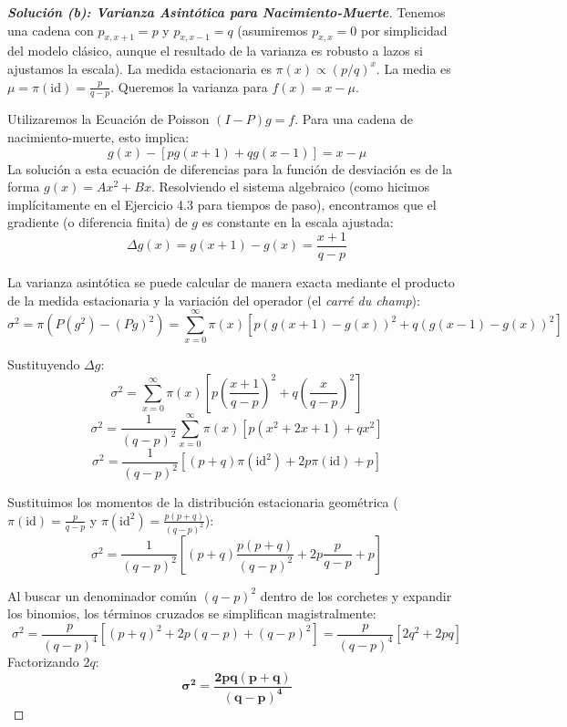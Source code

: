 \documentclass[10pt,a4paper]{article}
\begin{document}
\begin{proof}[\textbf{Solución (b): Varianza Asintótica para Nacimiento-Muerte}]
    Tenemos una cadena con $p_{x, x+1} = p$ y $p_{x, x-1} = q$ (asumiremos $p_{x,x}=0$ por simplicidad del modelo clásico, aunque el resultado de la varianza es robusto a lazos si ajustamos la escala). La medida estacionaria es $\pi(x) \propto (p/q)^x$. La media es $\mu = \pi(\text{id}) = \frac{p}{q-p}$. Queremos la varianza para $f(x) = x - \mu$.
    
    Utilizaremos la Ecuación de Poisson $(I - P)g = f$. Para una cadena de nacimiento-muerte, esto implica:
    \[ g(x) - [p g(x+1) + q g(x-1)] = x - \mu \]
    La solución a esta ecuación de diferencias para la función de desviación es de la forma $g(x) = A x^2 + B x$. Resolviendo el sistema algebraico (como hicimos implícitamente en el Ejercicio 4.3 para tiempos de paso), encontramos que el gradiente (o diferencia finita) de $g$ es constante en la escala ajustada:
    \[ \Delta g(x) = g(x+1) - g(x) = \frac{x+1}{q-p} \]
    
    La varianza asintótica se puede calcular de manera exacta mediante el producto de la medida estacionaria y la variación del operador (el \textit{carré du champ}):
    \[ \sigma^2 = \pi \left( P(g^2) - (Pg)^2 \right) = \sum_{x=0}^\infty \pi(x) \left[ p(g(x+1)-g(x))^2 + q(g(x-1)-g(x))^2 \right] \]
    
    Sustituyendo $\Delta g$:
    \[ \sigma^2 = \sum_{x=0}^\infty \pi(x) \left[ p\left(\frac{x+1}{q-p}\right)^2 + q\left(\frac{x}{q-p}\right)^2 \right] \]
    \[ \sigma^2 = \frac{1}{(q-p)^2} \sum_{x=0}^\infty \pi(x) \left[ p(x^2+2x+1) + qx^2 \right] \]
    \[ \sigma^2 = \frac{1}{(q-p)^2} \left[ (p+q)\pi(\text{id}^2) + 2p\pi(\text{id}) + p \right] \]
    
    Sustituimos los momentos de la distribución estacionaria geométrica ($\pi(\text{id}) = \frac{p}{q-p}$ y $\pi(\text{id}^2) = \frac{p(p+q)}{(q-p)^2}$):
    \[ \sigma^2 = \frac{1}{(q-p)^2} \left[ (p+q)\frac{p(p+q)}{(q-p)^2} + 2p\frac{p}{q-p} + p \right] \]
    
    Al buscar un denominador común $(q-p)^2$ dentro de los corchetes y expandir los binomios, los términos cruzados se simplifican magistralmente:
    \[ \sigma^2 = \frac{p}{(q-p)^4} \left[ (p+q)^2 + 2p(q-p) + (q-p)^2 \right] = \frac{p}{(q-p)^4} [2q^2 + 2pq] \]
    Factorizando $2q$:
    \[ \mathbf{\sigma^2 = \frac{2pq(p+q)}{(q-p)^4}} \]
\end{proof}

\vspace{5mm}
\end{document}
